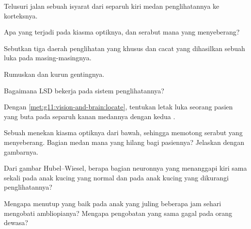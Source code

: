 \begin{exercise}[$\star$]\label{exo:g11:vision-and-brain:1}
Telusuri jalan sebuah isyarat dari separuh kiri medan penglihatannya ke
korteksnya.
\end{exercise}

\begin{exercise}[$\star$]\label{exo:g11:vision-and-brain:2}
Apa yang terjadi pada kiasma optiknya, dan serabut mana yang menyeberang?
\end{exercise}

\begin{exercise}[$\star$]\label{exo:g11:vision-and-brain:3}
Sebutkan tiga daerah penglihatan yang khusus dan cacat yang dihasilkan
sebuah luka pada masing-masingnya.
\end{exercise}

\begin{exercise}[$\star$]\label{exo:g11:vision-and-brain:4}
Rumuskan  dan kurun gentingnya.
\end{exercise}

\begin{exercise}[$\star$]\label{exo:g11:vision-and-brain:5}
Bagaimana LSD bekerja pada sistem penglihatannya?
\end{exercise}

\begin{exercise}[$\star\star$]\label{exo:g11:vision-and-brain:6}
Dengan \cref{met:g11:vision-and-brain:locate}, tentukan letak luka
seorang pasien yang buta pada separuh kanan medannya dengan kedua .
\end{exercise}

\begin{exercise}[$\star\star$]\label{exo:g11:vision-and-brain:7}
Sebuah  menekan kiasma optiknya dari bawah, sehingga memotong
serabut yang menyeberang. Bagian medan mana yang hilang bagi pasiennya?
Jelaskan dengan gambarnya.
\end{exercise}

\begin{exercise}[$\star\star$]\label{exo:g11:vision-and-brain:8}
Dari gambar Hubel--Wiesel, berapa bagian neuronnya yang menanggapi 
kiri sama sekali pada anak kucing yang normal dan pada anak kucing yang
dikurangi penglihatannya?
\end{exercise}

\begin{exercise}[$\star\star$]\label{exo:g11:vision-and-brain:9}
Mengapa menutup  yang baik pada anak yang juling beberapa jam
sehari mengobati ambliopianya? Mengapa pengobatan yang sama gagal pada
orang dewasa?
\end{exercise}

